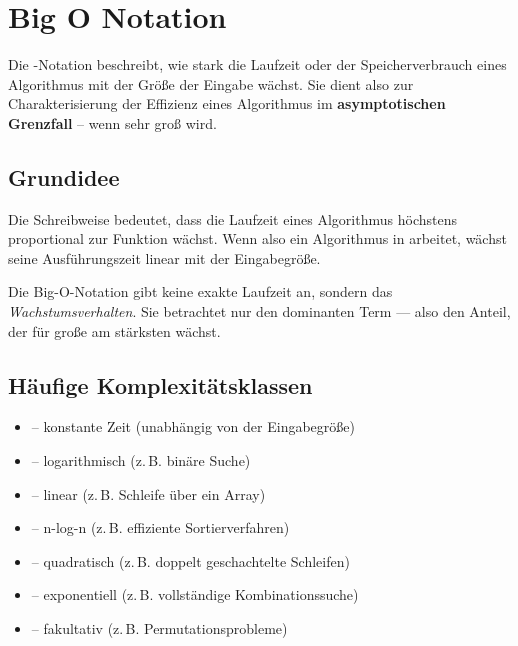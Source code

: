 
\section{Big O Notation}

Die -Notation beschreibt, wie stark die Laufzeit oder der Speicherverbrauch eines Algorithmus
mit der Größe der Eingabe  wächst.  
Sie dient also zur Charakterisierung der Effizienz eines Algorithmus im \textbf{asymptotischen Grenzfall} – 
wenn  sehr groß wird.

\subsection{Grundidee}

Die Schreibweise  bedeutet, dass die Laufzeit eines Algorithmus höchstens proportional 
zur Funktion  wächst.  
Wenn also ein Algorithmus in  arbeitet, wächst seine Ausführungszeit linear mit der Eingabegröße.

\begin{tcolorbox}[gray, title={Hinweis}]
    Die Big-O-Notation gibt keine exakte Laufzeit an, sondern das \emph{Wachstumsverhalten}.  
    Sie betrachtet nur den dominanten Term — also den Anteil, der für große  am stärksten wächst.
\end{tcolorbox}

\subsection{Häufige Komplexitätsklassen}

\begin{itemize}
    \item {} – konstante Zeit (unabhängig von der Eingabegröße)
    \item {} – logarithmisch (z.\,B. binäre Suche)
    \item {} – linear (z.\,B. Schleife über ein Array)
    \item {} – n-log-n (z.\,B. effiziente Sortierverfahren)
    \item {} – quadratisch (z.\,B. doppelt geschachtelte Schleifen)
    \item {} – exponentiell (z.\,B. vollständige Kombinationssuche)
    \item {} – fakultativ (z.\,B. Permutationsprobleme)
\end{itemize}

